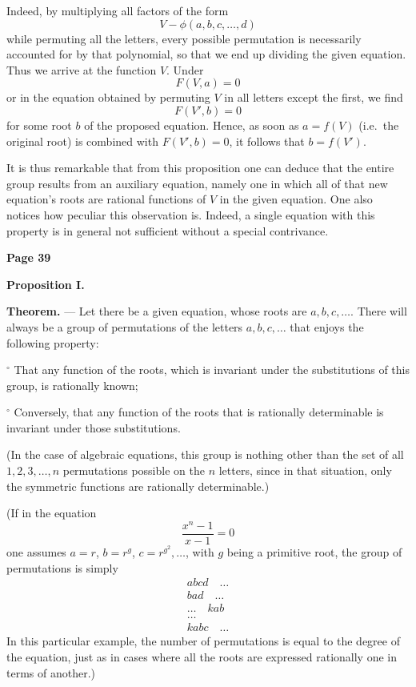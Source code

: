 \documentclass{article}
\begin{document}
\smallskip

\noindent
Indeed, by multiplying all factors of the form
\[
V - \phi(a, b, c, \dots, d)
\]
while permuting all the letters, every possible permutation is necessarily accounted for by that polynomial, so that we end up dividing the given equation. Thus we arrive at the function \(V\). Under
\[
F(V, a) = 0
\]
or in the equation obtained by permuting \(V\) in all letters except the first, we find
\[
F(V', b) = 0
\]
for some root \(b\) of the proposed equation. Hence, as soon as \(a = f(V)\) (i.e.\ the original root) is combined with \(F(V', b) = 0\), it follows that \(b = f(V')\).

\smallskip

\noindent
It is thus remarkable that from this proposition one can deduce that the entire group results from an auxiliary equation, namely one in which all of that new equation's roots are rational functions of \(V\) in the given equation. One also notices how peculiar this observation is. Indeed, a single equation with this property is in general not sufficient without a special contrivance.

\bigskip

\noindent
\textbf{Page 39}

\medskip

\noindent
\textbf{Proposition I.}

\smallskip

\noindent
\textbf{Theorem.} --- Let there be a given equation, whose roots are \(a, b, c, \dots\). There will always be a group of permutations of the letters \(a, b, c, \dots\) that enjoys the following property:

\smallskip

\(^\circ\) That any function of the roots, which is invariant under the substitutions of this group, is rationally known;

\(^\circ\) Conversely, that any function of the roots that is rationally determinable is invariant under those substitutions.

\smallskip

\noindent
(In the case of algebraic equations, this group is nothing other than the set of all \(1, 2, 3, \dots, n\) permutations possible on the \(n\) letters, since in that situation, only the symmetric functions are rationally determinable.)

\smallskip

\noindent
(If in the equation
\[
\frac{x^n - 1}{x - 1} = 0
\]
one assumes \(a = r\), \(b = r^g\), \(c = r^{g^2}, \dots\), with \(g\) being a primitive root, the group of permutations is simply
\[
\begin{matrix}
abcd \quad \dots \\
bad \quad \dots \\
\dots \quad kab \\
\dots \\
kabc \quad \dots
\end{matrix}
\]
In this particular example, the number of permutations is equal to the degree of the equation, just as in cases where all the roots are expressed rationally one in terms of another.)
\end{document}

